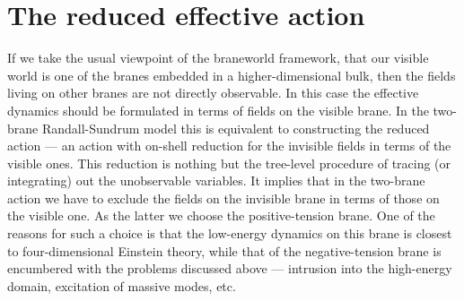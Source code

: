 \documentclass[a4paper,preprint,nofootinbib,
                 showpacs,preprintnumbers,amsmath,amssymb]{revtex4}
\begin{document}
 
 
\section{The reduced effective action\label{reduced}} 
If we take the usual viewpoint of the braneworld 
framework, that our visible world is one of the branes embedded in 
a higher-dimensional bulk, then the fields living on other branes 
are not directly observable. In this case the effective dynamics should be 
formulated in terms of fields on the visible brane. In the two-brane 
Randall-Sundrum model this is equivalent to constructing the reduced 
action --- an action with on-shell reduction for the invisible fields 
in terms of the visible ones. This reduction is nothing but the tree-level 
procedure of tracing (or integrating) out the unobservable variables. 
It implies that in the two-brane action we have to exclude the  
fields on the invisible brane in 
terms of those on the visible one. As the latter we choose the 
positive-tension brane. One of the reasons for such a choice is 
that the low-energy dynamics on this brane is closest to 
four-dimensional Einstein theory, while that of the 
negative-tension brane is encumbered with the problems discussed 
above --- intrusion into the high-energy domain, excitation of massive 
modes, etc. 
 
\end{document}
